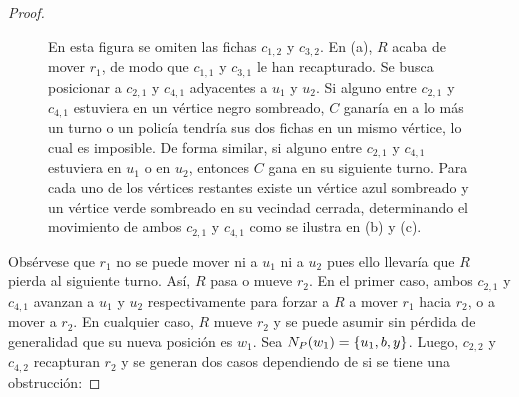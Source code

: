 \begin{proof}
\begin{figure}[ht!]
\begin{tcbitemize}
{\begin{tikzpicture}
                        \end{tikzpicture}
                    }
            \tcbitem[raster multicolumn=2]
                \tcblower
        \end{tcbitemize}
        \captionsetup{font=footnotesize}
        \caption{En esta figura se omiten las fichas $c_{1,2}$ y $c_{3,2}$. En
        (a), $R$ acaba de mover $r_1$, de modo que $c_{1,1}$ y $c_{3,1}$ le han
        recapturado. Se busca posicionar a $c_{2,1}$ y $c_{4,1}$ adyacentes a
        $u_1$ y $u_2$. Si alguno entre $c_{2,1}$ y $c_{4,1}$ estuviera en un
        v\'ertice negro sombreado, $C$ ganar\'ia en a lo m\'as un turno o un
        polic\'ia tendr\'ia sus dos fichas en un mismo v\'ertice, lo cual es
        imposible. De forma similar, si alguno entre $c_{2,1}$ y $c_{4,1}$
        estuviera en $u_1$ o en $u_2$, entonces $C$ gana en su siguiente turno.
        Para cada uno de los v\'ertices restantes existe un v\'ertice azul
        sombreado y un v\'ertice verde sombreado en su vecindad cerrada,
        determinando el movimiento de ambos $c_{2,1}$ y $c_{4,1}$ como se
        ilustra en (b) y (c).}
        \label{fig:guarding0}
    \end{figure}

    \newpage

    Obs\'ervese que $r_1$ no se puede mover ni a $u_1$ ni a $u_2$ pues ello
    llevar\'ia que $R$ pierda al siguiente turno. As\'i, $R$ pasa o mueve $r_2$.
    En el primer caso, ambos $c_{2,1}$ y $c_{4,1}$ avanzan a $u_1$ y $u_2$
    respectivamente para forzar a $R$ a mover $r_1$ hacia $r_2$, o a mover a
    $r_2$. En cualquier caso, $R$ mueve $r_2$ y se puede asumir sin p\'erdida de
    generalidad que su nueva posici\'on es $w_1$. Sea $N_P(w_1)=\left\{ u_1, b,y\right\}$.
    Luego, $c_{2,2}$ y $c_{4,2}$ recapturan $r_2$ y se generan dos casos
    dependiendo de si se tiene una obstrucci\'on:
    

\end{proof}
